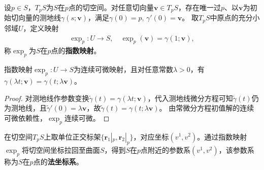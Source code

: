 \documentclass[../../main.tex]{subfiles}%
\begin{document}
\begin{definition}
设$p\in S$，$T_pS$为$S$在$p$点的切空间。对任意切向量$\boldsymbol{v}\in T_pS$，存在唯一过$p$、以$\boldsymbol{v}$为初始切向量的测地线$\gamma(s;\boldsymbol{v})$，满足$\gamma(0)=p,\,\gamma'(0)=\boldsymbol{v}$。
取$T_pS$中原点的充分小邻域$U$，定义映射
\begin{align*}
\exp_p:U\to S,\quad \exp_p(\boldsymbol{v})=\gamma(1;\boldsymbol{v}),
\end{align*}
称$\exp_p$为$S$在$p$点的\textbf{指数映射}。
\end{definition}

\begin{proposition}
指数映射$\exp_p:U\to S$为连续可微映射，且对任意常数$\lambda>0$，有$\gamma(\lambda t;\boldsymbol{v})=\gamma(t;\lambda\boldsymbol{v})$。
\end{proposition}
\begin{proof}
对测地线作参数变换$\tilde{\gamma}(t)=\gamma(\lambda t;\boldsymbol{v})$，代入测地线微分方程可知$\tilde{\gamma}(t)$仍为测地线，且$\tilde{\gamma}'(0)=\lambda\boldsymbol{v}$，故$\tilde{\gamma}(t)=\gamma(t;\lambda\boldsymbol{v})$。
由常微分方程初值解的连续可微依赖性，$\exp_p$连续可微。
\end{proof}

\begin{definition}
在切空间$T_pS$上取单位正交标架$\{\boldsymbol{r}_1|_p,\boldsymbol{r}_2|_p\}$，对应坐标$(v^1,v^2)$。通过指数映射$\exp_p$将切空间坐标拉回至曲面$S$，得到$S$在$p$点附近的参数系$(v^1,v^2)$，该参数系称为$S$在$p$点的\textbf{法坐标系}。
\end{definition}
\end{document}
